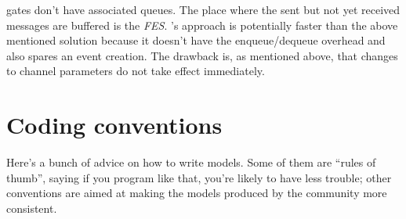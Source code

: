 {\opp} gates don't have associated queues. The place
where the sent but not yet received messages are buffered is the
\textit{FES}.  {\opp}'s approach is potentially faster
than the above mentioned solution because it doesn't have the
enqueue/dequeue overhead and also spares an event creation. The
drawback is, as mentioned above, that changes to channel parameters do
not take effect immediately.





\section{Coding conventions}

Here's a bunch of advice on how to write {\opp} models. Some 
of them are ``rules of thumb'', saying if you program like that, 
you're likely to have less trouble; other conventions are aimed 
at making the models produced by the {\opp} community more consistent.


